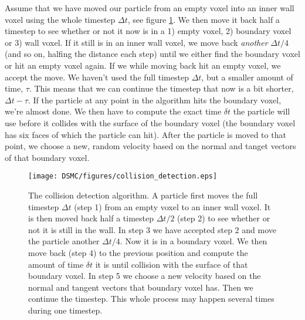 Assume that we have moved our particle from an empty voxel into an inner wall voxel using the whole timestep $\Delta t$, see figure \ref{fig:dsmc_collision_detection}. We then move it back half a timestep to see whether or not it now is in a 1) empty voxel, 2) boundary voxel or 3) wall voxel. If it still is in an inner wall voxel, we move back \textit{another} $\Delta t/4$ (and so on, halfing the distance each step) until we either find the boundary voxel or hit an empty voxel again. If we while moving back hit an empty voxel, we accept the move. We haven't used the full timestep $\Delta t$, but a smaller amount of time, $\tau$. This means that we can continue the timestep that now is a bit shorter, $\Delta t - \tau$. If the particle at any point in the algorithm hits the boundary voxel, we're almost done. We then have to compute the exact time $\delta t$ the particle will use before it collides with the surface of the boundary voxel (the boundary voxel has six faces of which the particle can hit). After the particle is moved to that point, we choose a new, random velocity based on the normal and tanget vectors of that boundary voxel.
\begin{figure}[h]
\begin{center}
\texttt{[image: DSMC/figures/collision\_detection.eps]}
\end{center}
\caption{The collision detection algorithm. A particle first moves the full timestep $\Delta t$ (step 1) from an empty voxel to an inner wall voxel. It is then moved back half a timestep  $\Delta t/2$ (step 2) to see whether or not it is still in the wall. In step 3 we have accepted step 2 and move the particle another $\Delta t/4$. Now it is in a boundary voxel. We then move back (step 4) to the previous position and compute the amount of time $\delta t$ it is until collision with the surface of that boundary voxel. In step 5 we choose a new velocity based on the normal and tangent vectors that boundary voxel has. Then we continue the timestep. This whole process may happen several times during one timestep.}
\label{fig:dsmc_collision_detection}
\end{figure}

